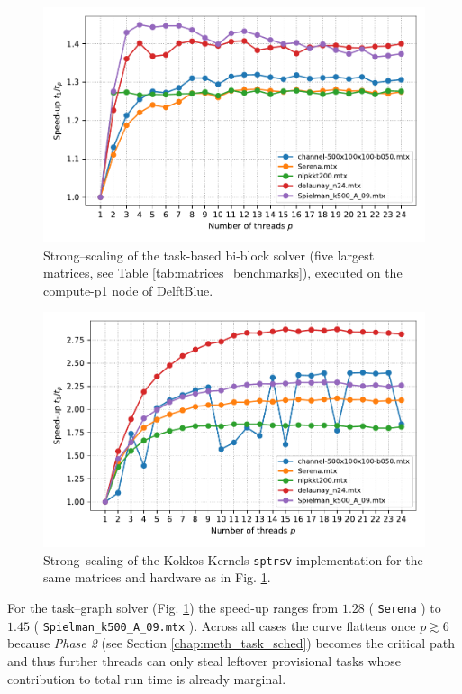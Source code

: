 \begin{figure}[htb]
  \centering
  \includegraphics[width=\linewidth]{report/figures/results/speedup_t_tasks_ms_top5.pdf}
  \caption{Strong–scaling of the task-based bi-block solver
           (five largest matrices, see
           Table \ref{tab:matrices_benchmarks}), executed on the compute-p1 node of DelftBlue.}
  \label{fig:parallel_speedup_task}
\end{figure}

\begin{figure}[htb]
  \centering
  \includegraphics[width=\linewidth]{report/figures/results/speedup_t_trilinos_ms_top5.pdf}
  \caption{Strong–scaling of the Kokkos-Kernels
           \texttt{sptrsv} implementation for the same matrices and
           hardware as in Fig. \ref{fig:parallel_speedup_task}.}
  \label{fig:parallel_speedup_kokkos}
\end{figure}

For the task–graph solver
(Fig. \ref{fig:parallel_speedup_task}) the speed-up ranges from
$1.28$ ( \texttt{Serena} ) to $1.45$
( \texttt{Spielman\_k500\_A\_09.mtx} ).  
Across all cases the curve flattens once $p\gtrsim6$ because
\emph{Phase 2} (see Section \ref{chap:meth_task_sched}) becomes the critical path and thus further threads can only
steal leftover provisional tasks whose contribution to total run time
is already marginal.

